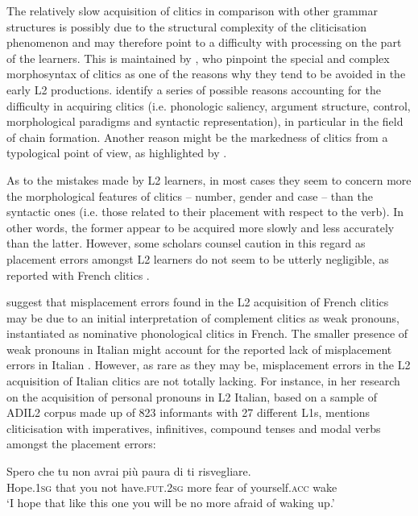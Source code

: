 \documentclass[output=paper,modfonts,nonflat,newtxmath]{langsci/langscibook}
\begin{document}
The relatively slow acquisition of clitics in comparison with other grammar structures is possibly due to the structural complexity of the cliticisation phenomenon and may therefore point to a difficulty with processing on the part of the learners. This is maintained by \citet{BellettiGuasti2015}, who pinpoint the special and complex morphosyntax of clitics as one of the reasons why they tend to be avoided in the early L2 productions. \citet{BottariEtAl2000} identify a series of possible reasons accounting for the difficulty in acquiring clitics (i.e. phonologic saliency, argument structure, control, morphological paradigms and syntactic representation), in particular in the field of chain formation. Another reason might be the markedness of clitics from a typological point of view, as highlighted by \citet[329]{Berretta1986}.

As to the mistakes made by L2 learners, in most cases they seem to concern more the morphological features of clitics – number, gender and case – than the syntactic ones (i.e. those related to their placement with respect to the verb). In other words, the former appear to be acquired more slowly and less accurately than the latter. However, some scholars counsel caution in this regard as placement errors amongst L2 learners do not seem to be utterly negligible, as reported with French clitics \citep{White1996, HulkMuller2000, BellettiHamann2004, GranfeldtSchlyter2004, HamannBelletti2006}.

\citet{HamannBelletti2006} suggest that misplacement errors found in the L2 acquisition of French clitics may be due to an initial interpretation of complement clitics as weak pronouns, instantiated as nominative phonological clitics in French. The smaller presence of weak pronouns in Italian might account for the reported lack of misplacement errors in Italian \citep{BellettiGuasti2015}. However, as rare as they may be, misplacement errors in the L2 acquisition of Italian clitics are not totally lacking. For instance, in her research on the acquisition of personal pronouns in L2 Italian, based on a sample of ADIL2 corpus made up of 823 informants with 27 different L1s, \citet[116]{Maffei2009} mentions cliticisation with imperatives, infinitives, compound tenses and modal verbs amongst the placement errors:

\ea  \label{ex:sciutti:28}
    \gll Spero che tu non avrai più paura di ti risvegliare.\\
         Hope.\textsc{1sg} that you not have.\textsc{fut.2sg} more fear of yourself.\textsc{acc} wake\\
    \glt  ‘I hope that like this one you will be no more afraid of waking up.’
\z
\end{document}
